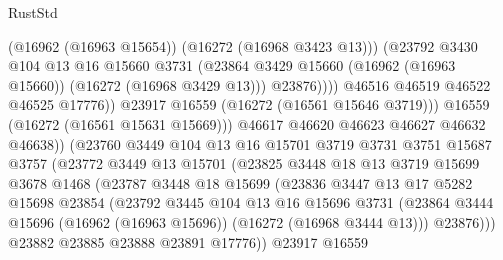 \begin{lexlean}{RustStd}
\begin{coremodule}
                                  (@16962 (@16963 @15654))
                                  (@16272 (@16968 @3423 @13)))
                                (@23792
                                  @3430
                                  @104
                                  @13
                                  @16
                                  @15660
                                  @3731
                                  (@23864
                                    @3429
                                    @15660
                                    (@16962 (@16963 @15660))
                                    (@16272 (@16968 @3429 @13)))
                                  @23876))))
                          @46516
                          @46519
                          @46522
                          @46525
                          @17776))
                      @23917
                      @16559
                      (@16272 (@16561 @15646 @3719)))
                    @16559
                    (@16272 (@16561 @15631 @15669)))
                  @46617
                  @46620
                  @46623
                  @46627
                  @46632
                  @46638))
              (@23760
                @3449
                @104
                @13
                @16
                @15701
                @3719
                @3731
                @3751
                @15687
                @3757
                (@23772
                  @3449
                  @13
                  @15701
                  (@23825
                    @3448
                    @18
                    @13
                    @3719
                    @15699
                    @3678
                    @1468
                    (@23787
                      @3448
                      @18
                      @15699
                      (@23836
                        @3447
                        @13
                        @17
                        @5282
                        @15698
                        @23854
                        (@23792
                          @3445
                          @104
                          @13
                          @16
                          @15696
                          @3731
                          (@23864 @3444 @15696 (@16962 (@16963 @15696)) (@16272 (@16968 @3444 @13)))
                          @23876)))
                    @23882
                    @23885
                    @23888
                    @23891
                    @17776))
                @23917
                @16559

\end{coremodule}
\end{lexlean}
